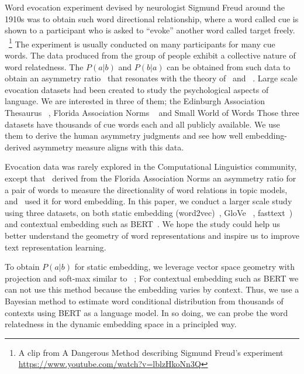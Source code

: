 \documentclass[letterpaper]{article} %
\begin{document}
Word evocation experiment devised by neurologist Sigmund Freud around the 1910s was to obtain such word directional relationship, where a word called cue is shown to a participant who is asked to ``evoke'' another word called target freely. ~\footnote{A clip from A Dangerous Method describing Sigmund Freud's experiment \url{https://www.youtube.com/watch?v=lblzHkoNn3Q}} The experiment is usually conducted on many participants for many cue words. The data produced from the group of people exhibit a collective nature of word relatedness. The $P(a|b)$ and $P(b|a)$ can be obtained from such data to obtain an asymmetry ratio~\citep{griffiths2007topics} that resonates with the theory of~\citet{tversky1977features} and ~\citet{Resnik:1995:UIC:1625855.1625914}. 
Large scale evocation datasets had been created to study the psychological aspects of language. We are interested in three of them; the Edinburgh Association Thesaurus
~\citep{kiss1973associative}, Florida Association Norms
~\citep{nelson2004university} and Small World of Words
\cite{de2019small} 
Those three datasets have thousands of cue words each and all publicly available. We use them to derive the human asymmetry judgments and see how well embedding-derived asymmetry measure aligns with this data.

Evocation data was rarely explored in the Computational Linguistics community, except that~\citet{griffiths2007topics} derived from the Florida Association Norms an asymmetry ratio for a pair of words to measure the directionality of word relations in topic models, and~\citet{nematzadeh2017evaluating} used it for word embedding. In this paper, we conduct a larger scale study using three datasets, on both static embedding (word2vec)~\citep{mikolov2013distributed}, GloVe ~\citep{pennington2014glove}, fasttext~\citep{mikolov2018advances}) and contextual embedding such as BERT~\citep{devlin2018bert}. We hope the study could help us better understand the geometry of word representations and inspire us to improve text representation learning.

To obtain $P(a|b)$ for static embedding, we leverage vector space geometry with projection and soft-max similar to ~\citep{nematzadeh2017evaluating,Levy2014NeuralWE,arora-etal-2016-latent}; For contextual embedding such as BERT we can not use this method because the embedding varies by context. Thus, we use a Bayesian method to estimate word conditional distribution from thousands of contexts using BERT as a language model. In so doing, we can probe the word relatedness in the dynamic embedding space in a principled way.
\end{document}
